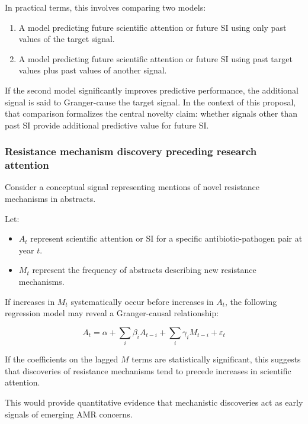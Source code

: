 \documentclass[
]{article}
\providecommand{\tightlist}{%
  \setlength{\itemsep}{0pt}\setlength{\parskip}{0pt}}
\begin{document}
In practical terms, this involves comparing two models:

\begin{enumerate}
\def\labelenumi{\arabic{enumi}.}
\tightlist
\item
  A model predicting future scientific attention or future SI using only
  past values of the target signal.
\item
  A model predicting future scientific attention or future SI using past
  target values plus past values of another signal.
\end{enumerate}

If the second model significantly improves predictive performance, the
additional signal is said to Granger-cause the target signal. In the
context of this proposal, that comparison formalizes the central novelty
claim: whether signals other than past SI provide additional predictive
value for future SI.

\subsubsection{Resistance mechanism discovery preceding
research
attention}\label{53-example-1-resistance-mechanism-discovery-preceding-research-attention}

Consider a conceptual signal representing mentions of novel resistance
mechanisms in abstracts.

Let:

\begin{itemize}
\tightlist
\item
  \(A_t\) represent scientific attention or SI for a specific
  antibiotic-pathogen pair at year \(t\).
\item
  \(M_t\) represent the frequency of abstracts describing new
  resistance mechanisms.
\end{itemize}

If increases in \(M_t\) systematically occur before increases in
\(A_t\), the following regression model may reveal a
Granger-causal relationship:

\[
A_t = \alpha + \sum_i \beta_i A_{t-i} + \sum_i \gamma_i M_{t-i} + \varepsilon_t
\]

If the coefficients on the lagged \(M\) terms are statistically
significant, this suggests that discoveries of resistance mechanisms
tend to precede increases in scientific attention.

This would provide quantitative evidence that mechanistic discoveries
act as early signals of emerging AMR concerns.
\end{document}
